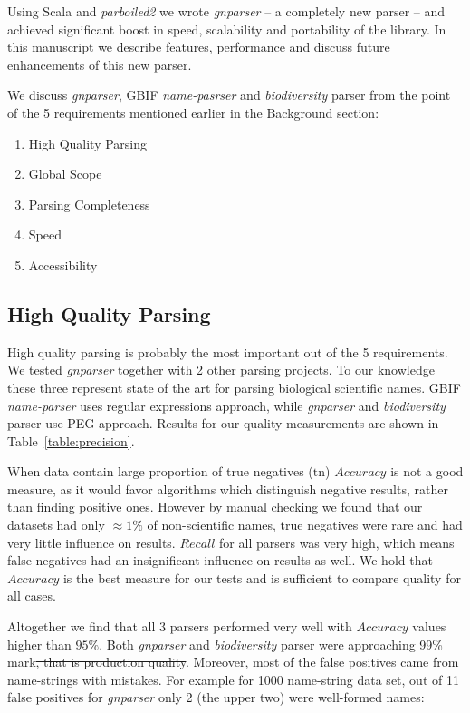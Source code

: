 \documentclass{bmcart}
\begin{document}
Using Scala and \textit{parboiled2} we wrote \textit{gnparser} -- a
completely new parser -- and achieved significant boost in speed, scalability
and portability of the library. In this manuscript we describe features,
performance and discuss future enhancements of this new parser.

We discuss \textit{gnparser}, GBIF \textit{name-pasrser} and
\textit{biodiversity} parser from the point of the 5 requirements mentioned
earlier in the Background section:

\begin{enumerate}
  \item High Quality Parsing
  \item Global Scope
  \item Parsing Completeness
  \item Speed
  \item Accessibility
\end{enumerate}

\subsection*{High Quality Parsing}

High quality parsing is probably the most important out of the 5 requirements.
We tested \textit{gnparser} together with 2 other parsing projects. To our
knowledge these three represent state of the art for parsing biological
scientific names. GBIF \textit{name-parser} uses regular expressions approach,
while \textit{gnparser} and \textit{biodiversity} parser use PEG approach.
Results for our quality measurements are shown in Table~\ref{table:precision}.

When data contain large proportion of true negatives ($\text{tn}$) $Accuracy$
is not a good measure, as it would favor algorithms which distinguish negative
results, rather than finding positive ones. However by manual checking we
found that our datasets had only $\approx1\%$ of non-scientific names, true
negatives were rare and had very little influence on results. $Recall$ for all
parsers was very high, which means false negatives had an insignificant
influence on results as well. We hold that $Accuracy$ is the best measure for
our tests and is sufficient to compare quality for all cases.

Altogether we find that all 3 parsers performed very well with $Accuracy$
values higher than $95\%$. Both \textit{gnparser} and \textit{biodiversity}
parser were approaching 99\% mark\st{, that is production
quality}. Moreover, most of
the false positives came from name-strings with mistakes. For example for 1000
name-string data set, out of 11 false positives for \textit{gnparser} only 2
(the upper two) were well-formed names:
\end{document}
